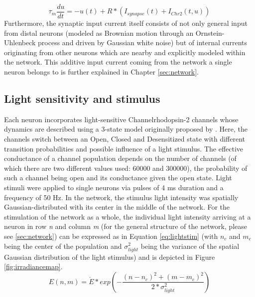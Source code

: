 \documentclass[14pt]{SelfArx} %
\numberwithin{equation}{section}
\begin{document}
\begin{equation}
\label{eq:lifgen3}
\tau _{m} \frac{du}{dt} = -u(t) + R* ( I_{synapse}(t) + I_{Chr2}(t,u))
\end{equation}
Furthermore, the synaptic input current itself consists of not only general input from distal neurons (modeled as Brownian motion through an Ornstein-Uhlenbeck process and driven by Gaussian white noise) but of internal currents originating from other neurons which are nearby and explicitly modeled within the network. This additive input current coming from the network a single neuron belongs to is further explained in Chapter \ref{sec:network}.  \newline
\subsection{Light sensitivity and stimulus}
\label{sec:stimulus}
Each neuron incorporates light-sensitive \newline Channelrhodopsin-2 channels whose dynamics are described using a 3-state model originally proposed by \cite{nagel}. \newline
Here, the channels switch between an Open, Closed and Desensitized state with different transition probabilities and possible influence of a light stimulus. The effective conductance of a channel population depends on the number of channels (of which there are two different values used: 60000 and 300000), the probability of such a channel being open and its conductance given the open state.\newline
Light stimuli were applied to single neurons via pulses of 4 ms duration and a frequency of 50 Hz. In the network, the stimulus light intensity was spatially Gaussian-distributed with its center in the middle of the network.
\newline
For the stimulation of the network as a whole, the individual light intensity arriving at a neuron in row \textit{n} and column \textit{m} (for the general structure of the network, please see \ref{sec:network}) can be expressed as in Equation \ref{eq:lightstim} (with $n_{c}$ and $m_{c}$ being the center of the population and $\sigma_{light}^{2}$ being the variance of the spatial Gaussian distribution of the light stimulus) and is depicted in Figure \ref{fig:irradiancemap}. \newline
\begin{equation}
\label{eq:lightstim}
E(n,m) = \dot{E}*exp(- \frac{(n-n_{c})^{2}+(m-m_{c})^{2}}{2*\sigma_{light}^{2}})
\end{equation}
\end{document}
